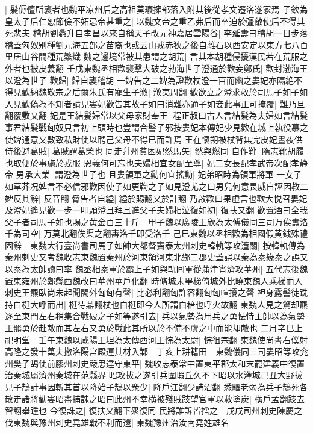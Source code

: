 |{
	髪傉儃所襲者也魏平凉州后之高祖莫瓌擁部落入附其後從孝文遷洛遂家焉}
子欽為皇太子后仁恕節儉不妬忌帝甚重之|{
	以魏文帝之重乙弗后而卒迫於彊敵使后不得其死悲夫}
稽胡劉蠡升自孝昌以來自稱天子改元神嘉居雲陽谷|{
	李延夀曰稽胡一日步落稽蓋匈奴别種劉元海五部之苗裔也或云山戎赤狄之後自離石以西安定以東方七八百里居山谷間種荒繁熾}
魏之邊境常被其患謂之胡荒|{
	言其本胡種侵擾漢民若在荒服之外者也被皮義翻}
壬戌東魏丞相歡襲擊大破之勃海世子澄通於歡妾鄭氏|{
	歡封渤海王以澄為世子}
歡歸|{
	歸自襲稽胡}
一婢告之二婢為證歡杖澄一百而幽之婁妃亦隔絶不得見歡納魏敬宗之后爾朱氏有寵生子浟|{
	浟夷周翻}
歡欲立之澄求救於司馬子如子如入見歡偽為不知者請見婁妃歡告其故子如曰消難亦通子如妾此事正可掩覆|{
	難乃旦翻覆敷又翻}
妃是王結髪婦常以父母家財奉王|{
	程正叔曰古人言結髪為夫婦如言結髪事君結髪戰匈奴只言初上頭時也豈謂合髻子邪按婁妃本傳妃少見歡在城上執役慕之使婢通意又數致私財使以聘己父母不得已而許焉}
王在懷朔被杖背無完皮妃晝夜供侍後避葛賊|{
	葛賊謂葛榮也}
同走幷州貧困妃然馬矢|{
	然與燃同}
自作靴|{
	隋志靴胡履也取便於事施於戎服}
恩義何可忘也夫婦相宜女配至尊|{
	妃二女長配孝武帝次配孝静帝}
男承大業|{
	謂澄為世子也}
且婁領軍之勳何宜搖動|{
	妃弟昭時為領軍將軍}
一女子如草芥况婢言不必信邪歡因使子如更鞫之子如見澄尤之曰男兒何意畏威自誣因教二婢反其辭|{
	反音翻}
脅告者自縊|{
	縊於賜翻又於計翻}
乃啟歡曰果虛言也歡大悦召婁妃及澄妃遙見歡一步一叩頭澄且拜且進父子夫婦相泣復如初|{
	復扶又翻}
歡置酒曰全我父子者司馬子如也賜之黄金百三十斤　甲子魏以廣陵王欣為太傅儀同三司万俟夀洛千為司空|{
	万莫北翻俟渠之翻夀洛千即受洛千}
己巳東魏以丞相歡為相國假黄鉞殊禮固辭　東魏大行臺尚書司馬子如帥大都督竇泰太州刺史韓軌等攻潼關|{
	按韓軌傳為秦州刺史又考魏收志東魏置秦州於河東領河東北鄉二郡史蓋誤以秦為泰緣泰之誤又以泰為太帥讀曰率}
魏丞相泰軍於霸上子如與軌囘軍從蒲津宵濟攻華州|{
	五代志後魏置東雍州於鄭縣西魏改曰華州華戶化翻}
時脩城未畢梯倚城外比曉東魏人乘梯而入刺史王羆臥尚未起聞閤外匈匈有聲|{
	比必利翻匈許容翻匈匈喧擾之聲}
袒身露髻徒跣持白梃大呼而出|{
	梃待鼎翻杖也白梃即今人所謂白棓也呼火故翻}
東魏人見之驚却羆逐至東門左右稍集合戰破之子如等遂引去|{
	兵以氣勢為用兵之勇怯恃主帥以為氣勢王羆勇於赴敵而其左右又勇於戰此其所以於不備不虞之中而能却敵也}
二月辛巳上祀明堂　壬午東魏以咸陽王坦為太傳西河王悰為太尉|{
	悰徂宗翻}
東魏使尚書右僕射高隆之發十萬夫撤洛陽宫殿運其材入鄴　丁亥上耕籍田　東魏儀同三司婁昭等攻兖州樊子鵠使前膠州刺史嚴思達守東平|{
	魏收志泰常中置東平郡太和末罷建義中復置治秦城屬濟州秦城在范縣界}
昭攻拔之遂引兵圍瑕丘久不下昭以水灌城己丑大野拔見子鵠計事因斬其首以降始子鵠以衆少|{
	降戶江翻少詩沼翻}
悉驅老弱為兵子鵠死各散走諸將勸婁昭盡捕誅之昭曰此州不幸横被殘賊跂望官軍以救塗炭|{
	横戶孟翻跂去智翻舉踵也}
今復誅之|{
	復扶又翻下衆復同}
民將誰訴皆捨之　戊戌司州刺史陳慶之伐東魏與豫州刺史堯雄戰不利而還|{
	東魏豫州治汝南堯姓雄名}
